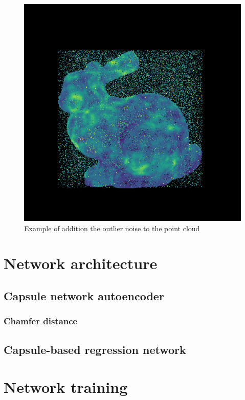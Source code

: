 \begin{figure}[htbp]
    \centerline{\includegraphics[scale=.6]{Figures/coords_outlier.png}}
    \caption{Example of addition the outlier noise to the point cloud \parencite{uchida_tom-uchidaadd_noise_to_point_cloud_2021}}
    \label{img:outlier-noise}
\end{figure}

\section{Network architecture}
\label{Network architecture}
\subsection{Capsule network autoencoder}
\subsubsection{Chamfer distance}
\subsection{Capsule-based regression network}

\section{Network training}

